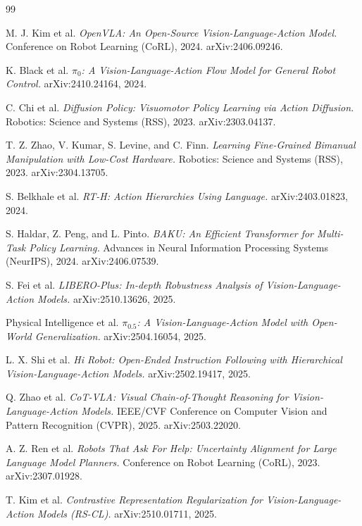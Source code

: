 \documentclass[11pt]{article}
\begin{document}
\begin{thebibliography}{99}

 M. J. Kim et al. \emph{OpenVLA: An Open-Source Vision-Language-Action Model.} Conference on Robot Learning (CoRL), 2024. arXiv:2406.09246.

 K. Black et al. \emph{$\pi_0$: A Vision-Language-Action Flow Model for General Robot Control.} arXiv:2410.24164, 2024.

 C. Chi et al. \emph{Diffusion Policy: Visuomotor Policy Learning via Action Diffusion.} Robotics: Science and Systems (RSS), 2023. arXiv:2303.04137.

 T. Z. Zhao, V. Kumar, S. Levine, and C. Finn. \emph{Learning Fine-Grained Bimanual Manipulation with Low-Cost Hardware.} Robotics: Science and Systems (RSS), 2023. arXiv:2304.13705.

 S. Belkhale et al. \emph{RT-H: Action Hierarchies Using Language.} arXiv:2403.01823, 2024.

 S. Haldar, Z. Peng, and L. Pinto. \emph{BAKU: An Efficient Transformer for Multi-Task Policy Learning.} Advances in Neural Information Processing Systems (NeurIPS), 2024. arXiv:2406.07539.

 S. Fei et al. \emph{LIBERO-Plus: In-depth Robustness Analysis of Vision-Language-Action Models.} arXiv:2510.13626, 2025.

 Physical Intelligence et al. \emph{$\pi_{0.5}$: A Vision-Language-Action Model with Open-World Generalization.} arXiv:2504.16054, 2025.

 L. X. Shi et al. \emph{Hi Robot: Open-Ended Instruction Following with Hierarchical Vision-Language-Action Models.} arXiv:2502.19417, 2025.

 Q. Zhao et al. \emph{CoT-VLA: Visual Chain-of-Thought Reasoning for Vision-Language-Action Models.} IEEE/CVF Conference on Computer Vision and Pattern Recognition (CVPR), 2025. arXiv:2503.22020.

 A. Z. Ren et al. \emph{Robots That Ask For Help: Uncertainty Alignment for Large Language Model Planners.} Conference on Robot Learning (CoRL), 2023. arXiv:2307.01928.

 T. Kim et al. \emph{Contrastive Representation Regularization for Vision-Language-Action Models (RS-CL).} arXiv:2510.01711, 2025.

\end{thebibliography}
\end{document}

